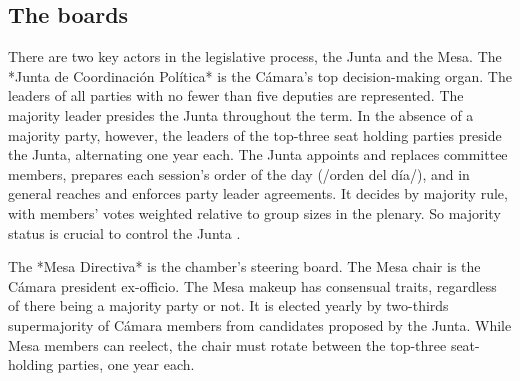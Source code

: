 \documentclass[letter,12pt]{article}
\begin{document}
  \subsection{The boards}
There are two key actors in the legislative process, the Junta and the Mesa. The *Junta de Coordinación Política* is the Cámara's top decision-making organ. The leaders of all parties with no fewer than five deputies are represented. The majority leader presides the Junta throughout the term. In the absence of a majority party, however, the leaders of the top-three seat holding parties preside the Junta, alternating one year each. The Junta appoints and replaces committee members, prepares each session's order of the day (/orden del día/), and in general reaches and enforces party leader agreements. It decides by majority rule, with members' votes weighted relative to group sizes in the plenary. So majority status is crucial to control the Junta \citep[cf.][]{cox.mccubbins.2005}.



The *Mesa Directiva* is the chamber's steering board. The Mesa chair is the Cámara president ex-officio. The Mesa makeup has consensual traits, regardless of there being a majority party or not. It is elected yearly by two-thirds supermajority of Cámara members from candidates proposed by the Junta. While Mesa members can reelect, the chair must rotate between the top-three seat-holding parties, one year each. 


\end{document}
